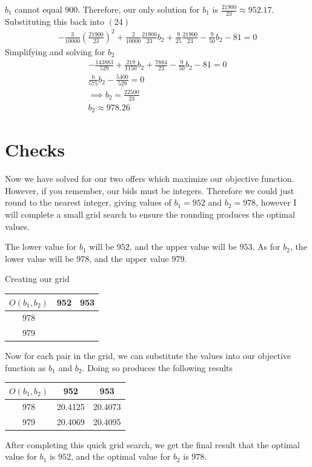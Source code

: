 \documentclass{article}
\begin{document}
$b_1$ cannot equal $900$. Therefore, our only solution for $b_1$ is $\frac{21900}{23} \approx 952.17$.
Substituting this back into $(24)$
\begin{gather}
    -\frac{3}{10000}\left(\frac{21900}{23}\right)^2 + \frac{2}{10000}\frac{21900}{23}b_2+\frac{9}{25}\frac{21900}{23} - \frac{9}{50}b_2 - 81 = 0
\end{gather}
Simplifying and solving for $b_2$
\begin{gather}
    -\frac{143883}{529} + \frac{219}{1150}b_2 + \frac{7884}{23} - \frac{9}{50}b_2 - 81 = 0\\
    \frac{6}{575}b_2 - \frac{5400}{529} = 0 \\
    \implies b_2 = \frac{22500}{23} \\
    b_2 \approx 978.26
\end{gather}

\section*{Checks}
Now we have solved for our two offers which maximize our objective function.
However, if you remember, our bids must be integers. Therefore we could just round
to the nearest integer, giving values of $b_1 = 952$ and $b_2 = 978$, however I will
complete a small grid search to ensure the rounding produces the optimal values.

The lower value for $b_1$ will be $952$, and the upper value will be $953$. As for $b_2$,
the lower value will be $978$, and the upper value $979$.

Creating our grid
\begin{center}
    \begin{tabular}{ |c|c|c| }
        \hline
        $O(b_1, b_2)$& 952 & 953 \\
        \hline
        978 & & \\
        \hline
        979 & & \\
        \hline
    \end{tabular}
\end{center}

Now for each pair in the grid, we can substitute the values into our 
objective function as $b_1$ and $b_2$. Doing so produces the following results
\begin{center}
    \begin{tabular}{ |c|c|c| }
        \hline
        $O(b_1, b_2)$ & 952 & 953 \\
        \hline
        978 & 20.4125 & 20.4073 \\
        \hline
        979 & 20.4069 & 20.4095 \\
        \hline
    \end{tabular}
\end{center}

After completing this quick grid search, we get the final result that the optimal value for
$b_1$ is $952$, and the optimal value for $b_2$ is $978$.
\end{document}
